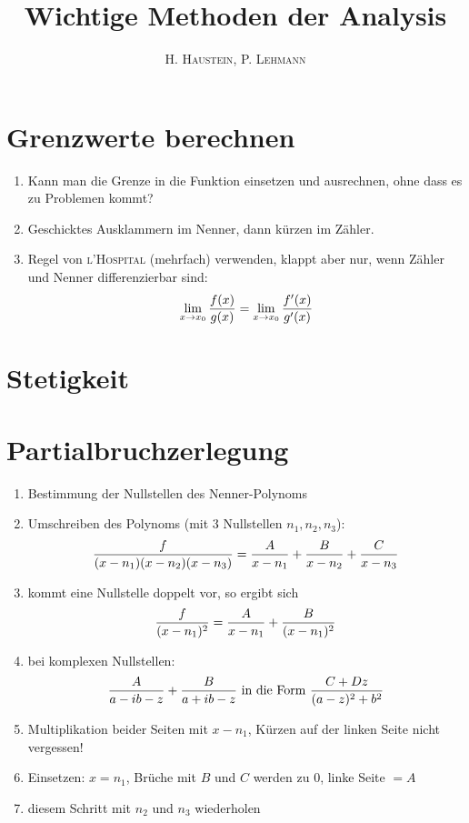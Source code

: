 \documentclass[ngerman,a4paper]{article}
\title{\textbf{Wichtige Methoden der Analysis}}
\author{\textsc{H. Haustein}, \textsc{P. Lehmann}}
\begin{document}
\maketitle

\section{Grenzwerte berechnen}
\begin{enumerate}[label=\textbf{\arabic*.}]
	\item Kann man die Grenze in die Funktion einsetzen und ausrechnen, ohne dass es zu Problemen kommt? 
	\item Geschicktes Ausklammern im Nenner, dann kürzen im Zähler.
	\item Regel von \textsc{l'Hospital} (mehrfach) verwenden, klappt aber nur, wenn Zähler und Nenner differenzierbar sind:
	\begin{align}
	\lim\limits_{x\to x_0}\frac{f(x)}{g(x)}=\lim\limits_{x\to x_0}\frac{f'(x)}{g'(x)}\notag
	\end{align}
\end{enumerate}

\section{Stetigkeit}

\section{Partialbruchzerlegung}
\begin{enumerate}[label=\textbf{\arabic*.}]
	\item Bestimmung der Nullstellen des Nenner-Polynoms
	\item Umschreiben des Polynoms (mit 3 Nullstellen $n_1,n_2,n_3$):
	\begin{align}
		\frac{f}{(x-n_1)(x-n_2)(x-n_3)}=\frac{A}{x-n_1}+\frac{B}{x-n_2}+\frac{C}{x-n_3}\notag
	\end{align}
	\item kommt eine Nullstelle doppelt vor, so ergibt sich
	\begin{align}
		\frac{f}{(x-n_1)^2}=\frac{A}{x-n_1}+\frac{B}{(x-n_1)^2}\notag
	\end{align}
	\item bei komplexen Nullstellen:
	\begin{align}
		\frac{A}{a-ib-z}+\frac{B}{a+ib-z} \text{ in die Form } \frac{C+Dz}{(a-z)^2+b^2}\notag
	\end{align}
	\item Multiplikation beider Seiten mit $x-n_1$, Kürzen auf der linken Seite nicht vergessen!
	\item Einsetzen: $x=n_1$, Brüche mit $B$ und $C$ werden zu 0, linke Seite $= A$
	\item diesem Schritt mit $n_2$ und $n_3$ wiederholen
\end{enumerate}
\end{document}
